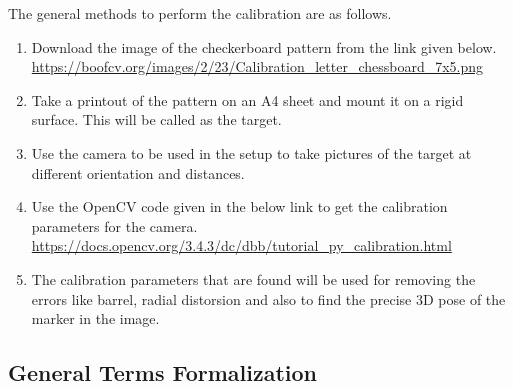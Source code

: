 The general methods to perform the calibration are as follows.

\begin{enumerate}
	\item
	Download the image of the checkerboard pattern from the link given below.
	\href{https://boofcv.org/images/2/23/Calibration_letter_chessboard_7x5.png}{https://boofcv.org/images/2/23/Calibration\_letter\_chessboard\_7x5.png}
	
	\item
	Take a printout of the pattern on an A4 sheet and mount it on a rigid surface. This will be called as the target.
	
	\item
	Use the camera to be used in the setup to take pictures of the target at different orientation and distances.
	
	\item
	Use the OpenCV code given in the below link to get the calibration parameters for the camera. 
	\href{https://docs.opencv.org/3.4.3/dc/dbb/tutorial_py_calibration.html}{https://docs.opencv.org/3.4.3/dc/dbb/tutorial\_py\_calibration.html}
	
	\item
	The calibration parameters that are found will be used for removing the errors like barrel, radial distorsion and also to find the precise 3D pose of the marker in the image.


\end{enumerate}

\subsection{General Terms Formalization}


